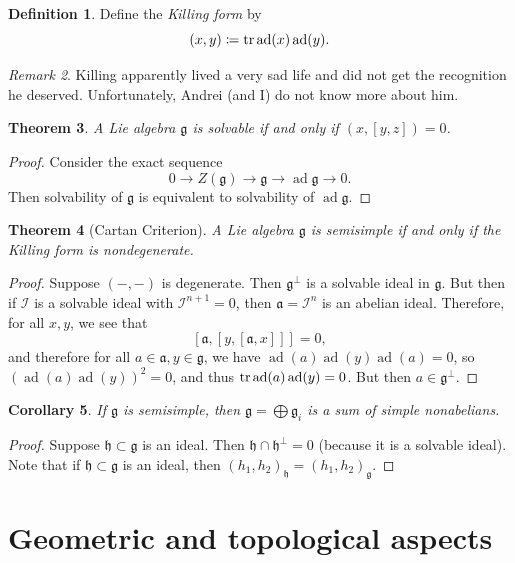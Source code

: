 \documentclass[leqno, openany]{memoir}
\newtheorem{thm}{Theorem}[section]
\newtheorem{cor}[thm]{Corollary}
\theoremstyle{definition}
\newtheorem{defn}[thm]{Definition}
\theoremstyle{remark}
\newtheorem{rmk}[thm]{Remark}
\theoremstyle{plain}
\theoremstyle{definition}
\theoremstyle{remark}
\newcommand{\mc}[1]{\mathcal{#1}}
\newcommand{\mf}[1]{\mathfrak{#1}}
\DeclareMathOperator{\ad}{ad}
\begin{document}
\begin{defn} Define the \textit{Killing form} by \[ (x,y) \coloneqq \tr \ad(x)
\ad(y). \] \end{defn}

\begin{rmk} Killing apparently lived a very sad life and did not get the
recognition he deserved. Unfortunately, Andrei (and I) do not know more about
him.  \end{rmk}

\begin{thm} A Lie algebra $\mf{g}$ is solvable if and only if $(x, [y,z]) = 0$.
\end{thm}

\begin{proof} Consider the exact sequence \[ 0 \to Z(\mf{g}) \to \mf{g} \to \ad
\mf{g} \to 0. \] Then solvability of $\mf{g}$ is equivalent to solvability of
$\ad \mf{g}$.  \end{proof}

\begin{thm}[Cartan Criterion] A Lie algebra $\mf{g}$ is semisimple if and only
if the Killing form is nondegenerate.  \end{thm}

\begin{proof} Suppose $(-,-)$ is degenerate. Then $\mf{g}^{\perp}$ is a
    solvable ideal in $\mf{g}$. But then if $\mc{I}$ is a solvable ideal with
    $\mc{I}^{n+1} = 0$, then $\mf{a} = \mc{I}^n$ is an abelian ideal.
    Therefore, for all $x,y$, we see that \[ [\mf{a}, [y,[\mf{a}, x]]] = 0, \]
    and therefore for all $a \in \mf{a}, y \in \mf{g}$, we have $\ad (a) \ad(y)
    \ad(a) = 0$, so ${(\ad(a) \ad(y))}^2 = 0$, and thus $\tr \ad(a) \ad(y) =
    0$. But then $a \in \mf{g}^{\perp}$.  \end{proof}

\begin{cor} If $\mf{g}$ is semisimple, then $\mf{g} = \bigoplus \mf{g}_i$ is a
sum of simple nonabelians.  \end{cor}

\begin{proof} Suppose $\mf{h} \subset \mf{g}$ is an ideal. Then $\mf{h} \cap
\mf{h}^{\perp} = 0$ (because it is a solvable ideal). Note that if $\mf{h}
\subset \mf{g}$ is an ideal, then ${(h_1, h_2)}_{\mf{h}} = {(h_1,
h_2)}_{\mf{g}}$.  \end{proof}

\chapter{Geometric and topological aspects}%
\end{document}
